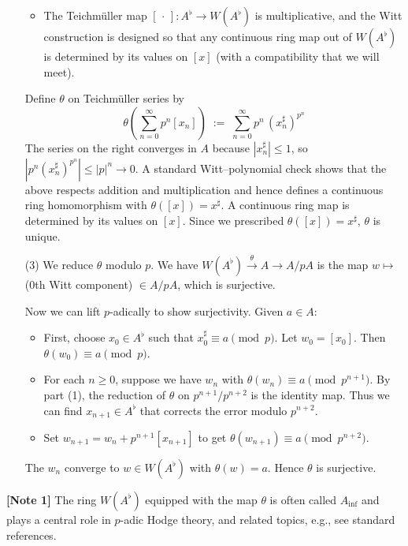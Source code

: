 \documentclass[12pt]{article}  %
\begin{document}
\begin{solution}
\begin{enumerate}
\begin{itemize}
    \item The Teichmüller map $[\,\cdot\,]:A^\flat\to W(A^\flat)$ is multiplicative, and the Witt
    construction is designed so that any continuous ring map out of $W(A^\flat)$ is determined
    by its values on $[x]$ (with a compatibility that we will meet).
    \end{itemize}
    Define $\theta$ on Teichmüller series by
    \[
\theta\!\left(\sum_{n=0}^\infty p^n [x_n]\right)
    \;:=\; \sum_{n=0}^\infty p^n \,(x_n^\sharp)^{p^n}
    \]
    The series on the right converges in $A$ because $|x_n^\sharp|\le1$, so
    $|p^n(x_n^\sharp)^{p^n}|\le |p|^n\to0$.
    A standard Witt–polynomial check shows that the above respects addition and multiplication and hence defines a continuous ring homomorphism with
    $\theta([x])=x^\sharp$. A continuous ring map is determined by its values on $[x]$. Since we prescribed
    $\theta([x])=x^\sharp$, $\theta$ is unique.

    \item[(3)] We reduce $\theta$ modulo $p$. We have
    $W(A^\flat)\xrightarrow{\ \theta\ } A \longrightarrow A/pA$
    is the map $w\mapsto$ (0th Witt component) $\in A/pA$, which is surjective.


    Now we can lift $p$-adically to show surjectivity. Given $a\in A$:
    \begin{itemize}
        \item First, choose $x_0\in A^\flat$ such that $x_0^\sharp\equiv a \pmod{p}$. Let $w_0=[x_0]$. Then $\theta(w_0)\equiv a \pmod{p}$.
        \item For each $n\ge 0$, suppose we have $w_n$ with $\theta(w_n)\equiv a \pmod{p^{n+1}}$. By part (1), the reduction of $\theta$ on $p^{n+1}/p^{n+2}$ is the identity map. Thus we can find $x_{n+1}\in A^\flat$ that corrects the error modulo $p^{n+2}$.
        \item Set $w_{n+1}=w_n+p^{n+1}[x_{n+1}]$ to get $\theta(w_{n+1})\equiv a \pmod{p^{n+2}}$.
    \end{itemize}

    The $w_n$ converge to $w\in W(A^\flat)$ with $\theta(w)=a$. Hence $\theta$ is surjective.
\end{enumerate}
\end{solution}

\noindent\textbf{[Note 1]} The ring $W(A^\flat)$ equipped with the map $\theta$ is often
called $A_{\mathrm{inf}}$ and plays a central role in $p$-adic Hodge theory, and related
topics, e.g., see standard references.
\end{document}
